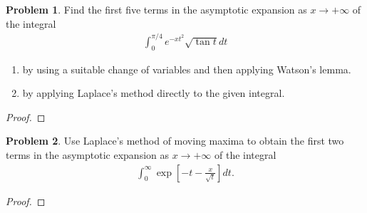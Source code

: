 \documentclass[12pt]{article}
\theoremstyle{definition}
\newtheorem{problem}{Problem}
\begin{document}
\begin{problem}
  Find the first five terms in the asymptotic expansion as $x \to +\infty$ of the integral
  \begin{align*}
    \int_0^{\pi/4} e^{-xt^2}\sqrt{\tan t}   dt
  \end{align*}
  \begin{enumerate}
    \item by using a suitable change of variables and then applying Watson's lemma.
    \item by applying Laplace's method directly to the given integral.
  \end{enumerate}
\end{problem}

\begin{proof}
\end{proof}
\newpage


\begin{problem}
  Use Laplace's method of moving maxima to obtain the first two terms in the asymptotic
  expansion as $x \to +\infty$ of the integral
  \begin{align}\label{exp_int}
    \int_{0}^\infty \exp\left[-t - \frac{x}{\sqrt{t}}\right] dt.
  \end{align}
\end{problem}

\begin{proof}
\end{proof}
\newpage
\end{document}
